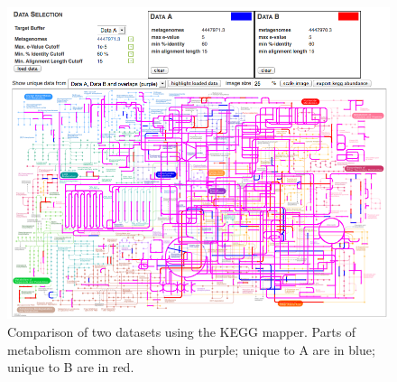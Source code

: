 \documentclass[12pt,fullpage]{report}
\begin{document}
\begin{figure}[ht]
\begin{center}
\includegraphics[width=6in]{Images/analysis-page-kegg-mapper-example.png}
\end{center}
\caption{Comparison of two datasets using the KEGG mapper. Parts of metabolism common are shown in purple; unique to A are in blue; unique to B are in red.}
\label{fig:analysis-page-kegg-mapper-example}
\end{figure}


\end{document}
